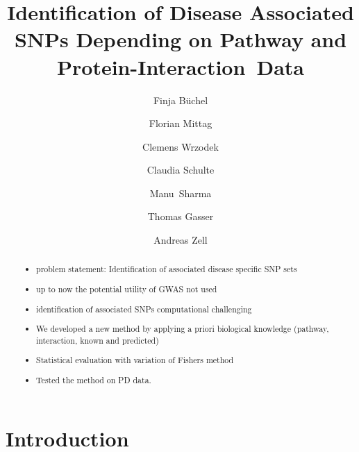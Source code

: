 \documentclass[citeauthoryear]{llncs}
\begin{document}
\title{Identification of Disease Associated SNPs Depending on Pathway and Protein-Interaction~Data}

\author{Finja B\"uchel \and Florian Mittag \and Clemens Wrzodek
\and Claudia Schulte \and Manu~Sharma 
\and Thomas Gasser \and Andreas Zell}


\maketitle


\begin{abstract}
%
%
%
%
\begin{itemize}
\item problem statement: Identification of associated disease specific SNP sets\\
\item up to now the potential utility of GWAS not used\\
\item identification of associated SNPs computational challenging\\
\item We developed a new method by applying a priori biological knowledge (pathway, interaction, known and predicted)\\
\item Statistical evaluation with variation of Fishers method\\
\item Tested the method on PD data.
\end{itemize}

\end{abstract}

\section{Introduction}
%
%
\end{document}
